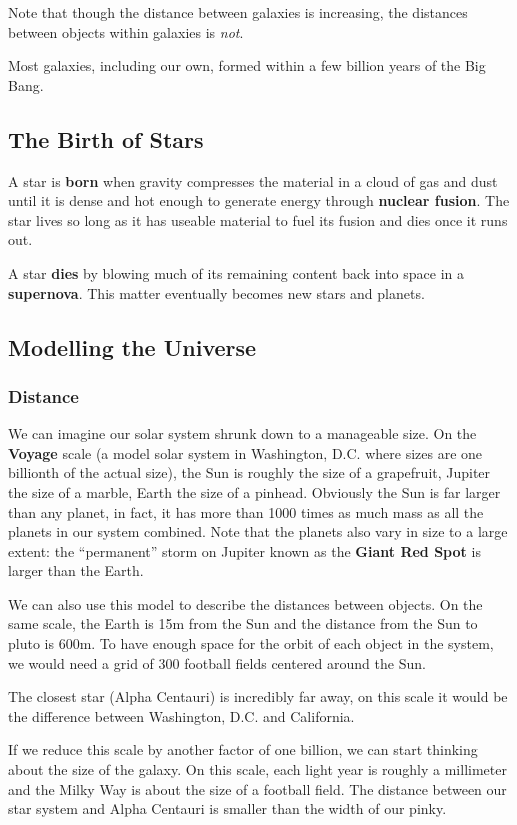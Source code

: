 Note that though the distance between galaxies is increasing, the distances between objects within galaxies is \emph{not}.

Most galaxies, including our own, formed within a few billion years of the Big Bang.

\subsection{The Birth of Stars}
A star is {\bf born} when gravity compresses the material in a cloud of gas and dust until it is dense and hot enough to generate energy through {\bf nuclear fusion}. The star lives so long as it has useable material to fuel its fusion and dies once it runs out.

A star {\bf dies} by blowing much of its remaining content back into space in a {\bf supernova}. This matter eventually becomes new stars and planets.

\subsection{Modelling the Universe}
\subsubsection{Distance}
We can imagine our solar system shrunk down to a manageable size. On the {\bf Voyage} scale (a model solar system in Washington, D.C. where sizes are one billionth of the actual size), the Sun is roughly the size of a grapefruit, Jupiter the size of a marble, Earth the size of a pinhead. Obviously the Sun is far larger than any planet, in fact, it has more than 1000 times as much mass as all the planets in our system combined. Note that the planets also vary in size to a large extent: the ``permanent'' storm on Jupiter known as the {\bf Giant Red Spot} is larger than the Earth.

We can also use this model to describe the distances between objects. On the same scale, the Earth is 15m from the Sun and the distance from the Sun to pluto is 600m. To have enough space for the orbit of each object in the system, we would need a grid of 300 football fields centered around the Sun.

The closest star (Alpha Centauri) is incredibly far away, on this scale it would be the difference between Washington, D.C. and California.

If we reduce this scale by another factor of one billion, we can start thinking about the size of the galaxy. On this scale, each light year is roughly a millimeter and the Milky Way is about the size of a football field. The distance between our star system and Alpha Centauri is smaller than the width of our pinky.

